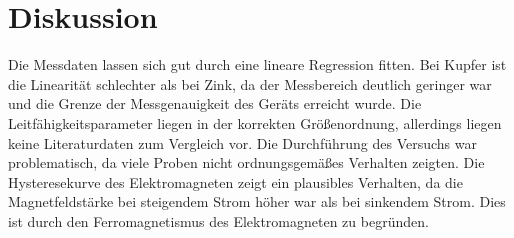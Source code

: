 \section{Diskussion}
\label{sec:Diskussion}

Die Messdaten lassen sich gut durch eine lineare Regression fitten. Bei Kupfer ist die Linearität schlechter als bei Zink, da der Messbereich deutlich geringer war und die Grenze der Messgenauigkeit des Geräts erreicht wurde. Die Leitfähigkeitsparameter liegen in der korrekten Größenordnung, allerdings liegen keine Literaturdaten zum Vergleich vor. Die Durchführung des Versuchs war problematisch, da viele Proben nicht ordnungsgemäßes Verhalten zeigten. Die Hysteresekurve des Elektromagneten zeigt ein plausibles Verhalten, da die Magnetfeldstärke bei steigendem Strom höher war als bei sinkendem Strom. Dies ist durch den Ferromagnetismus des Elektromagneten zu begründen.

